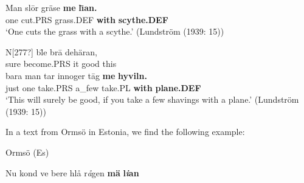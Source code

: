 \item 


 \ea\label{}
\gll Man  sl\=or  gräse  \textbf{me} \textbf{l}\textbf{\=\i}\textbf{an.}\\


one  cut.PRS  grass.DEF  \textbf{with} \textbf{scythe.DEF}\\

\glt ‘One cuts the grass with a scythe.’ (Lundström (1939: 15))

\z

\item 


 \ea\label{}
\gll N[277?]  bl\=\ir  e  br\=a  dehäran,\\


sure  become.PRS  it  good  this\\

 \ea\label{}
\gll bara  man  tar  innoger  t\=ag  \textbf{me} \textbf{hyviln.}\\


just  one  take.PRS  a\_few  take.PL  \textbf{with} \textbf{plane.DEF}\\

\glt ‘This will surely be good, if you take a few shavings with a plane.’ (Lundström (1939: 15))

\z

In a text from Ormsö in Estonia, we find the following example:


\item 

Ormsö (Es)



 \ea\label{}
\gll Nu  kond  ve  bere  hlå  r\textit{å}gen  \textbf{mä} \textbf{l}\textbf{\textit{i}}\textbf{an}\\


